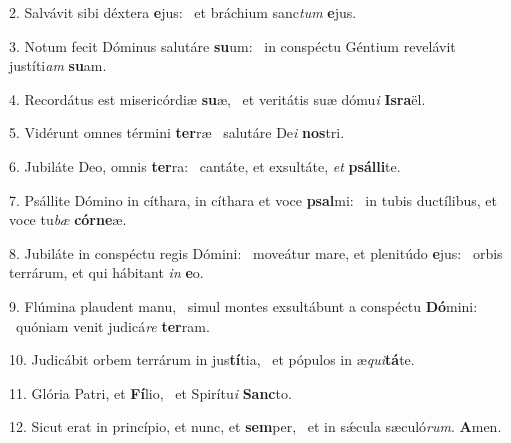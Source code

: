 2. Salvávit sibi déxtera \textbf{e}jus: \ast\  et bráchium sanc\textit{tum} \textbf{e}jus.\

3. Notum fecit Dóminus salutáre \textbf{su}um: \ast\  in conspéctu Géntium revelávit justíti\textit{am} \textbf{su}am.\

4. Recordátus est misericórdiæ \textbf{su}æ, \ast\  et veritátis suæ dómu\textit{i} \textbf{Is}\textbf{ra}ël.\

5. Vidérunt omnes términi \textbf{ter}ræ \ast\  salutáre De\textit{i} \textbf{nos}tri.\

6. Jubiláte Deo, omnis \textbf{ter}ra: \ast\  cantáte, et exsultáte, \textit{et} \textbf{psál}\textbf{li}te.\

7. Psállite Dómino in cíthara, in cíthara et voce \textbf{psal}mi: \ast\  in tubis ductílibus, et voce tu\textit{bæ} \textbf{cór}\textbf{ne}æ.\

8. Jubiláte in conspéctu regis Dómini: \dag\  moveátur mare, et plenitúdo \textbf{e}jus: \ast\  orbis terrárum, et qui hábitant \textit{in} \textbf{e}o.\

9. Flúmina plaudent manu, \dag\  simul montes exsultábunt a conspéctu \textbf{Dó}mini: \ast\  quóniam venit judicá\textit{re} \textbf{ter}ram.\

10. Judicábit orbem terrárum in jus\textbf{tí}tia, \ast\  et pópulos in æ\textit{qui}\textbf{tá}te.\

11. Glória Patri, et \textbf{Fí}lio, \ast\  et Spirítu\textit{i} \textbf{Sanc}to.\

12. Sicut erat in princípio, et nunc, et \textbf{sem}per, \ast\  et in sǽcula sæculó\textit{rum}. \textbf{A}men.\

